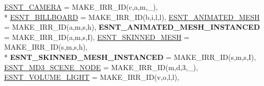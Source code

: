 \begin{DoxyCompactItemize}
\hyperlink{namespaceirr_1_1scene_acad3d7ef92a9807d391ba29120f3b7bda117834c96690a72567a0a813708cf3b6}{E\+S\+N\+T\+\_\+\+C\+A\+M\+E\+RA} = M\+A\+K\+E\+\_\+\+I\+R\+R\+\_\+\+ID(\textquotesingle{}c\textquotesingle{},\textquotesingle{}a\textquotesingle{},\textquotesingle{}m\textquotesingle{},\textquotesingle{}\+\_\+\textquotesingle{}), 
\\*
\hyperlink{namespaceirr_1_1scene_acad3d7ef92a9807d391ba29120f3b7bda85e4b3fca8fceb3de9057e91926d2a5f}{E\+S\+N\+T\+\_\+\+B\+I\+L\+L\+B\+O\+A\+RD} = M\+A\+K\+E\+\_\+\+I\+R\+R\+\_\+\+ID(\textquotesingle{}b\textquotesingle{},\textquotesingle{}i\textquotesingle{},\textquotesingle{}l\textquotesingle{},\textquotesingle{}l\textquotesingle{}), 
\hyperlink{namespaceirr_1_1scene_acad3d7ef92a9807d391ba29120f3b7bda073d7fe9dfd49f24cb13bfae56d8d3b6}{E\+S\+N\+T\+\_\+\+A\+N\+I\+M\+A\+T\+E\+D\+\_\+\+M\+E\+SH} = M\+A\+K\+E\+\_\+\+I\+R\+R\+\_\+\+ID(\textquotesingle{}a\textquotesingle{},\textquotesingle{}m\textquotesingle{},\textquotesingle{}s\textquotesingle{},\textquotesingle{}h\textquotesingle{}), 
{\bfseries E\+S\+N\+T\+\_\+\+A\+N\+I\+M\+A\+T\+E\+D\+\_\+\+M\+E\+S\+H\+\_\+\+I\+N\+S\+T\+A\+N\+C\+ED} = M\+A\+K\+E\+\_\+\+I\+R\+R\+\_\+\+ID(\textquotesingle{}a\textquotesingle{},\textquotesingle{}m\textquotesingle{},\textquotesingle{}s\textquotesingle{},\textquotesingle{}I\textquotesingle{}), 
\hyperlink{namespaceirr_1_1scene_acad3d7ef92a9807d391ba29120f3b7bdaed40abbffbd2043f3b061c1923371b26}{E\+S\+N\+T\+\_\+\+S\+K\+I\+N\+N\+E\+D\+\_\+\+M\+E\+SH} = M\+A\+K\+E\+\_\+\+I\+R\+R\+\_\+\+ID(\textquotesingle{}s\textquotesingle{},\textquotesingle{}m\textquotesingle{},\textquotesingle{}s\textquotesingle{},\textquotesingle{}h\textquotesingle{}), 
\\*
{\bfseries E\+S\+N\+T\+\_\+\+S\+K\+I\+N\+N\+E\+D\+\_\+\+M\+E\+S\+H\+\_\+\+I\+N\+S\+T\+A\+N\+C\+ED} = M\+A\+K\+E\+\_\+\+I\+R\+R\+\_\+\+ID(\textquotesingle{}s\textquotesingle{},\textquotesingle{}m\textquotesingle{},\textquotesingle{}s\textquotesingle{},\textquotesingle{}I\textquotesingle{}), 
\hyperlink{namespaceirr_1_1scene_acad3d7ef92a9807d391ba29120f3b7bda9e1745f6f4b6772eb8b92de4436db5b6}{E\+S\+N\+T\+\_\+\+M\+D3\+\_\+\+S\+C\+E\+N\+E\+\_\+\+N\+O\+DE} = M\+A\+K\+E\+\_\+\+I\+R\+R\+\_\+\+ID(\textquotesingle{}m\textquotesingle{},\textquotesingle{}d\textquotesingle{},\textquotesingle{}3\textquotesingle{},\textquotesingle{}\+\_\+\textquotesingle{}), 
\hyperlink{namespaceirr_1_1scene_acad3d7ef92a9807d391ba29120f3b7bda4dc59bfbe8afbb4d97bbbad1b356bea6}{E\+S\+N\+T\+\_\+\+V\+O\+L\+U\+M\+E\+\_\+\+L\+I\+G\+HT} = M\+A\+K\+E\+\_\+\+I\+R\+R\+\_\+\+ID(\textquotesingle{}v\textquotesingle{},\textquotesingle{}o\textquotesingle{},\textquotesingle{}l\textquotesingle{},\textquotesingle{}l\textquotesingle{}), 

\end{DoxyCompactItemize}
